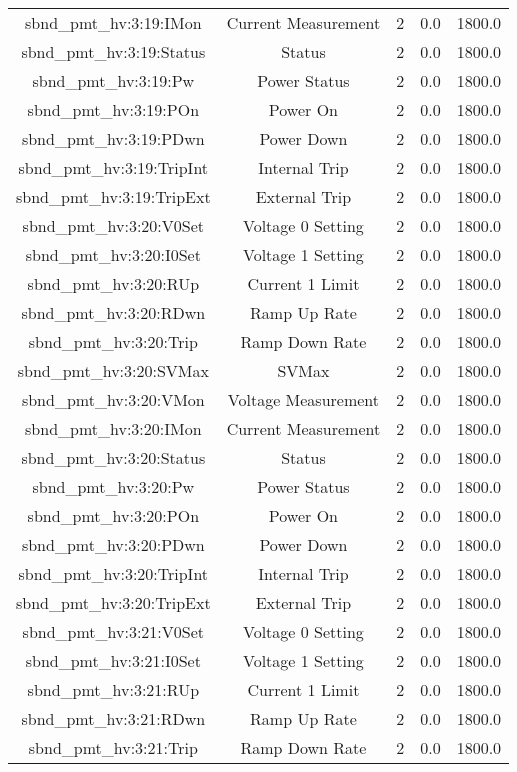 \begin{center}
\begin{longtable}{c | c c c c }
sbnd\_pmt\_hv:3:19:IMon & Current Measurement & 2 & 0.0 & 1800.0\\ 
sbnd\_pmt\_hv:3:19:Status & Status & 2 & 0.0 & 1800.0\\ 
sbnd\_pmt\_hv:3:19:Pw & Power Status & 2 & 0.0 & 1800.0\\ 
sbnd\_pmt\_hv:3:19:POn & Power On & 2 & 0.0 & 1800.0\\ 
sbnd\_pmt\_hv:3:19:PDwn & Power Down & 2 & 0.0 & 1800.0\\ 
sbnd\_pmt\_hv:3:19:TripInt & Internal Trip & 2 & 0.0 & 1800.0\\ 
sbnd\_pmt\_hv:3:19:TripExt & External Trip & 2 & 0.0 & 1800.0\\ 
sbnd\_pmt\_hv:3:20:V0Set & Voltage 0 Setting & 2 & 0.0 & 1800.0\\ 
sbnd\_pmt\_hv:3:20:I0Set & Voltage 1 Setting & 2 & 0.0 & 1800.0\\ 
sbnd\_pmt\_hv:3:20:RUp & Current 1 Limit & 2 & 0.0 & 1800.0\\ 
sbnd\_pmt\_hv:3:20:RDwn & Ramp Up Rate & 2 & 0.0 & 1800.0\\ 
sbnd\_pmt\_hv:3:20:Trip & Ramp Down Rate & 2 & 0.0 & 1800.0\\ 
sbnd\_pmt\_hv:3:20:SVMax & SVMax & 2 & 0.0 & 1800.0\\ 
sbnd\_pmt\_hv:3:20:VMon & Voltage Measurement & 2 & 0.0 & 1800.0\\ 
sbnd\_pmt\_hv:3:20:IMon & Current Measurement & 2 & 0.0 & 1800.0\\ 
sbnd\_pmt\_hv:3:20:Status & Status & 2 & 0.0 & 1800.0\\ 
sbnd\_pmt\_hv:3:20:Pw & Power Status & 2 & 0.0 & 1800.0\\ 
sbnd\_pmt\_hv:3:20:POn & Power On & 2 & 0.0 & 1800.0\\ 
sbnd\_pmt\_hv:3:20:PDwn & Power Down & 2 & 0.0 & 1800.0\\ 
sbnd\_pmt\_hv:3:20:TripInt & Internal Trip & 2 & 0.0 & 1800.0\\ 
sbnd\_pmt\_hv:3:20:TripExt & External Trip & 2 & 0.0 & 1800.0\\ 
sbnd\_pmt\_hv:3:21:V0Set & Voltage 0 Setting & 2 & 0.0 & 1800.0\\ 
sbnd\_pmt\_hv:3:21:I0Set & Voltage 1 Setting & 2 & 0.0 & 1800.0\\ 
sbnd\_pmt\_hv:3:21:RUp & Current 1 Limit & 2 & 0.0 & 1800.0\\ 
sbnd\_pmt\_hv:3:21:RDwn & Ramp Up Rate & 2 & 0.0 & 1800.0\\ 
sbnd\_pmt\_hv:3:21:Trip & Ramp Down Rate & 2 & 0.0 & 1800.0\\ 

\end{longtable}
\end{center}
